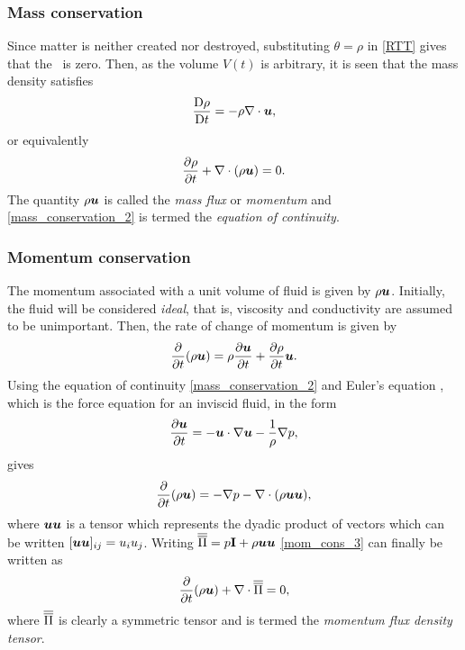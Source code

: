 \subsubsection{Mass conservation}
Since matter is neither created nor destroyed, substituting $\theta=\rho$ in \eqref{RTT} gives that the \lhs\ is zero. Then, as the volume $V(t)$ is arbitrary, it is seen that the mass density satisfies
\begin{equation}\label{mass_conservation}
 \frac{\mathrm{D}\rho}{\mathrm{D} t}=-\rho\nabla\cdot{\mbox{\boldmath$u$}},
\end{equation}
or equivalently
\begin{equation}\label{mass_conservation_2}
 \frac{\partial\rho}{\partial{t}}+\nabla\cdot(\rho{\mbox{\boldmath$u$}})=0.
\end{equation}
The quantity $\rho{\mbox{\boldmath$u$}}$ is called the \textit{mass flux} or \textit{momentum} and \eqref{mass_conservation_2} is termed the \textit{equation of continuity}.

\subsubsection{Momentum conservation}
The momentum associated with a unit volume of fluid is given by $\rho{\mbox{\boldmath$u$}}$. Initially, the fluid will be considered \textit{ideal}, that is, viscosity and conductivity are assumed to be unimportant. Then, the rate of change of momentum is given by
\begin{equation}\label{mom_cons_1}
 \frac{\partial}{\partial{t}}(\rho{\mbox{\boldmath$u$}})=\rho\frac{\partial{\mbox{\boldmath$u$}}}{\partial{t}}+\frac{\partial\rho}{\partial{t}}{\mbox{\boldmath$u$}}.
\end{equation}
Using the equation of continuity \eqref{mass_conservation_2} and Euler's
equation \citep{batchelor1967}, which is the force equation for an inviscid fluid, in the form
\begin{equation}\label{mom_cons_2}
 \frac{\partial{\mbox{\boldmath$u$}}}{\partial{t}}=-{\mbox{\boldmath$u$}}\cdot\nabla{\mbox{\boldmath$u$}}-\frac{1}{\rho}\nabla{p},
\end{equation}
gives
\begin{equation}\label{mom_cons_3}
 \frac{\partial}{\partial{t}}(\rho{\mbox{\boldmath$u$}})=-\nabla{p}-\nabla\cdot(\rho{\mbox{\boldmath$u$}}{\mbox{\boldmath$u$}}),
\end{equation}
where ${\mbox{\boldmath$u$}}{\mbox{\boldmath$u$}}$ is a tensor which represents the dyadic product of vectors which can be written $[{\mbox{\boldmath$u$}}{\mbox{\boldmath$u$}}]_{ij}=u_{i}u_{j}$. Writing $\overline{\overline{\Pi}}=p\mathbf{I}+\rho{\mbox{\boldmath$u$}}{\mbox{\boldmath$u$}}$ \eqref{mom_cons_3} can finally be written as
\begin{equation}\label{mom_cons_4}
 \frac{\partial}{\partial{t}}(\rho{\mbox{\boldmath$u$}})+\nabla\cdot\overline{\overline{\Pi}}=0,
\end{equation}
where $\overline{\overline{\Pi}}$ is clearly a symmetric tensor and is termed the \textit{momentum flux density tensor}.

